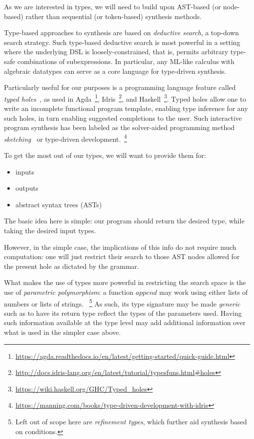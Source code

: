 \documentclass{article}
\begin{document}
As we are interested in types, we will need to build upon AST-based (or node-based) rather than sequential (or token-based) synthesis methods.

Type-based approaches to synthesis are based on \emph{deductive search}, a top-down search strategy.
Such type-based deductive search is most powerful in a setting where the underlying DSL is loosely-constrained, that is, permits arbitrary type-safe combinations of subexpressions. In particular, any ML-like calculus with algebraic datatypes can serve as a core language for type-driven synthesis.~\citep{gulwani2017program}

Particularly useful for our purposes is a programming language feature called \emph{typed holes}~\citep{hashimoto1997typed}, as used in Agda~\footnote{\url{https://agda.readthedocs.io/en/latest/getting-started/quick-guide.html}}, Idris~\footnote{\url{http://docs.idris-lang.org/en/latest/tutorial/typesfuns.html\#holes}}, and Haskell~\footnote{\url{https://wiki.haskell.org/GHC/Typed_holes}}. Typed holes allow one to write an incomplete functional program template, enabling type inference for any such holes, in turn enabling suggested completions to the user. Such interactive program synthesis has been labeled as the solver-aided programming method \emph{sketching}~\citep{gulwani2017program} or type-driven development.~\footnote{\url{https://manning.com/books/type-driven-development-with-idris}}

To get the most out of our types, we will want to provide them for:
\begin{itemize}
    \item inputs
    \item outputs
    \item abstract syntax trees (ASTs)
\end{itemize}

The basic idea here is simple: our program should return the desired type, while taking the desired input types.

However, in the simple case, the implications of this info do not require much computation: one will just restrict their search to those AST nodes allowed for the present hole as dictated by the grammar.

What makes the use of types more powerful in restricting the search space is the use of \emph{parametric polymorphism}: a function $append$ may work using either lists of numbers or lists of strings.
~\footnote{Left out of scope here are \emph{refinement types}, which further aid synthesis based on conditions.}
As such, its type signature may be made \emph{generic} such as to have its return type reflect the types of the parameters used. Having such information available at the type level may add additional information over what is used in the simpler case above.
\end{document}
